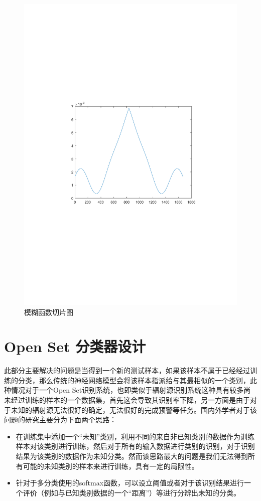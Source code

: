 \begin{figure}
	\centering
	\includegraphics{figures/af.pdf}
	\caption{模糊函数切片图}
\end{figure}

\section{Open Set 分类器设计}

此部分主要解决的问题是当得到一个新的测试样本，如果该样本不属于已经经过训练的分类，那么传统的神经网络模型会将该样本指派给与其最相似的一个类别，此种情况对于一个Open Set识别系统，也即类似于辐射源识别系统这种具有较多尚未经过训练的样本的一个数据集，首先这会导致其识别率下降，另一方面是由于对于未知的辐射源无法很好的确定，无法很好的完成预警等任务。国内外学者对于该问题的研究主要分为下面两个思路：

\begin{itemize}
	\item 在训练集中添加一个“未知”类别，利用不同的来自非已知类别的数据作为训练样本对该类别进行训练，然后对于所有的输入数据进行类别的识别，对于识别结果为该类别的数据作为未知分类。然而该思路最大的问题是我们无法得到所有可能的未知类别的样本来进行训练，具有一定的局限性。
	
	\item 针对于多分类使用的softmax函数，可以设立阈值或者对于该识别结果进行一个评价（例如与已知类别数据的一个“距离”）等进行分辨出未知的分类。
\end{itemize}


